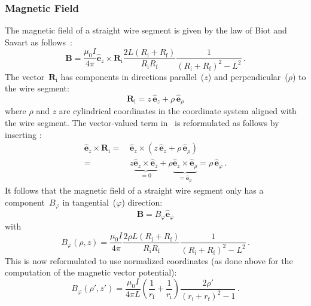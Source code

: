 \subsubsection{Magnetic Field}
\label{sec:methods_sws_magfld}
The magnetic field of a straight wire segment
is given by the law of Biot and Savart as follows~\cite{hanson_hirshman_2002}:
\begin{equation}
 \mathbf{B}
 = \frac{\mu_0 I}{4 \pi}
   \hat{\mathbf{e}}_z \times \mathbf{R}_\mathrm{i}
   \frac{2 L (R_\mathrm{i} + R_\mathrm{f})}{R_\mathrm{i} R_\mathrm{f}} \frac{1}{\left(R_\mathrm{i} + R_\mathrm{f}\right)^2 - L^2} \, . \label{eqn:sws_B_phi}
\end{equation}
The vector~$\mathbf{R}_\mathrm{i}$ has components in directions parallel~($z$) and perpendicular~($\rho$) to the wire segment:
\begin{equation}
 \mathbf{R}_\mathrm{i}
 = z \,\hat{\mathbf{e}}_z + \rho \,\hat{\mathbf{e}}_\rho \label{eqn:R_i_vec}
\end{equation}
where $\rho$ and $z$ are cylindrical coordinates in the coordinate system aligned with the wire segment.
The vector-valued term in~ is reformulated as follows by inserting :
\begin{align}
 \hat{\mathbf{e}}_z \times \mathbf{R}_\mathrm{i}
 =&\, \hat{\mathbf{e}}_z \times \left( z \,\hat{\mathbf{e}}_z + \rho \,\hat{\mathbf{e}}_\rho \right) \nonumber \\
 =&\,      z \underbrace{\hat{\mathbf{e}}_z \times \hat{\mathbf{e}}_z}_{=0}
      + \rho \underbrace{\hat{\mathbf{e}}_z \times \hat{\mathbf{e}}_\rho}_{=\hat{\mathbf{e}}_\varphi}
 = \rho \,\hat{\mathbf{e}}_\varphi \, .
\end{align}
It follows that the magnetic field of a straight wire segment only has a component~$B_\varphi$ in tangential~($\varphi$) direction:
\begin{equation}
 \mathbf{B} = B_\varphi \hat{\mathbf{e}}_\varphi
\end{equation}
with
\begin{equation}
 B_\varphi (\rho, z)
 = \frac{\mu_0 I}{4 \pi}
   \frac{2 \rho L (R_\mathrm{i} + R_\mathrm{f})}{R_\mathrm{i} R_\mathrm{f}}
   \frac{1}{\left(R_\mathrm{i} + R_\mathrm{f}\right)^2 - L^2} \, .
\end{equation}
This is now reformulated to use normalized coordinates
(as done above for the computation of the magnetic vector potential):
\begin{equation}
 B_\varphi(\rho', z')
 = \frac{\mu_0 I}{4 \pi L}
   \left(\frac{1}{r_\mathrm{f}} + \frac{1}{r_\mathrm{i}} \right)
   \frac{2 \rho'}{\left( r_\mathrm{i} + r_\mathrm{f} \right)^2 - 1} \, .
\end{equation}
